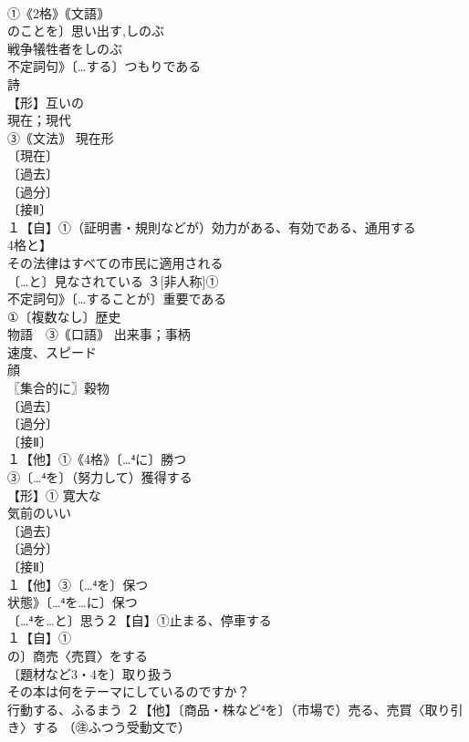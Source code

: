 \documentclass[8pt]{extreport}
\begin{document}
\begin{CJK}{UTF8}{min}
\\	①《2格》｟文語｠
\\	のことを〕思い出す,しのぶ 
\\	戦争犠牲者をしのぶ 
\\	不定詞句》〔…する〕つもりである 
\\	詩 
\\	【形】互いの 
\\	現在；現代 
\\	③｟文法｠ 現在形 
\\	〔現在〕
\\	〔過去〕
\\	〔過分〕
\\	〔接Ⅱ〕
\\	１【自】①（証明書・規則などが）効力がある、有効である、通用する 
\\	4格と】
\\	その法律はすべての市民に適用される 
\\	〔…と〕見なされている ３[非人称]①
\\	不定詞句》〔…することが〕重要である 
\\	①〔複数なし〕歴史 
\\	物語　③｟口語｠ 出来事；事柄 
\\	速度、スピード 
\\	顔 
\\	〖集合的に〗穀物 
\\	〔過去〕
\\	〔過分〕
\\	〔接Ⅱ〕
\\	１【他】①《4格》〔…⁴に〕勝つ 
\\	③〔…⁴を〕（努力して）獲得する
\\	【形】① 寛大な 
\\	気前のいい
\\	〔過去〕
\\	〔過分〕
\\	〔接Ⅱ〕
\\	１【他】③〔…⁴を〕保つ　
\\	状態》〔…⁴を…に〕保つ 
\\	〔…⁴を…と〕思う２【自】①止まる、停車する
\\	１【自】①
\\	の〕商売〈売買〉をする 
\\	〔題材など3・4を〕取り扱う 
\\	その本は何をテーマにしているのですか？ 
\\	行動する、ふるまう ２【他】〔商品・株など⁴を〕（市場で）売る、売買〈取り引き〉する （㊟ふつう受動文で） 

\end{CJK}
\end{document}

